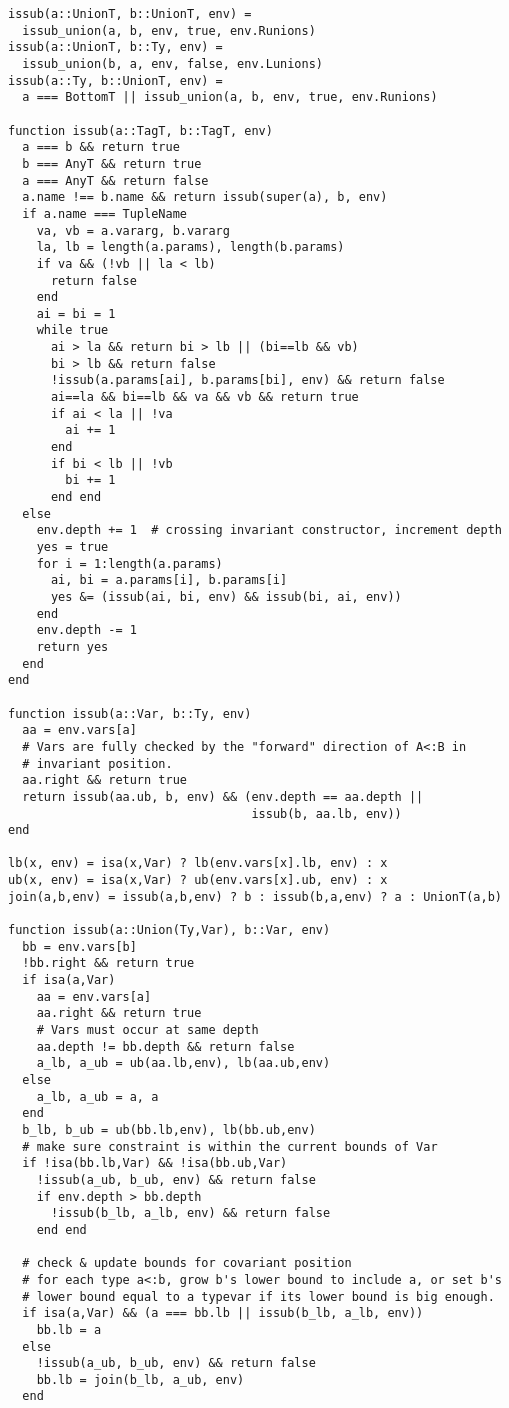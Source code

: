 \begin{singlespace}
\begin{lstlisting}[style=customjulia]
issub(a::UnionT, b::UnionT, env) =
  issub_union(a, b, env, true, env.Runions)
issub(a::UnionT, b::Ty, env) =
  issub_union(b, a, env, false, env.Lunions)
issub(a::Ty, b::UnionT, env) =
  a === BottomT || issub_union(a, b, env, true, env.Runions)

function issub(a::TagT, b::TagT, env)
  a === b && return true
  b === AnyT && return true
  a === AnyT && return false
  a.name !== b.name && return issub(super(a), b, env)
  if a.name === TupleName
    va, vb = a.vararg, b.vararg
    la, lb = length(a.params), length(b.params)
    if va && (!vb || la < lb)
      return false
    end
    ai = bi = 1
    while true
      ai > la && return bi > lb || (bi==lb && vb)
      bi > lb && return false
      !issub(a.params[ai], b.params[bi], env) && return false
      ai==la && bi==lb && va && vb && return true
      if ai < la || !va
        ai += 1
      end
      if bi < lb || !vb
        bi += 1
      end end
  else
    env.depth += 1  # crossing invariant constructor, increment depth
    yes = true
    for i = 1:length(a.params)
      ai, bi = a.params[i], b.params[i]
      yes &= (issub(ai, bi, env) && issub(bi, ai, env))
    end
    env.depth -= 1
    return yes
  end
end

function issub(a::Var, b::Ty, env)
  aa = env.vars[a]
  # Vars are fully checked by the "forward" direction of A<:B in
  # invariant position.
  aa.right && return true
  return issub(aa.ub, b, env) && (env.depth == aa.depth ||
                                  issub(b, aa.lb, env))
end

lb(x, env) = isa(x,Var) ? lb(env.vars[x].lb, env) : x
ub(x, env) = isa(x,Var) ? ub(env.vars[x].ub, env) : x
join(a,b,env) = issub(a,b,env) ? b : issub(b,a,env) ? a : UnionT(a,b)

function issub(a::Union(Ty,Var), b::Var, env)
  bb = env.vars[b]
  !bb.right && return true
  if isa(a,Var)
    aa = env.vars[a]
    aa.right && return true
    # Vars must occur at same depth
    aa.depth != bb.depth && return false
    a_lb, a_ub = ub(aa.lb,env), lb(aa.ub,env)
  else
    a_lb, a_ub = a, a
  end
  b_lb, b_ub = ub(bb.lb,env), lb(bb.ub,env)
  # make sure constraint is within the current bounds of Var
  if !isa(bb.lb,Var) && !isa(bb.ub,Var)
    !issub(a_ub, b_ub, env) && return false
    if env.depth > bb.depth
      !issub(b_lb, a_lb, env) && return false
    end end

  # check & update bounds for covariant position
  # for each type a<:b, grow b's lower bound to include a, or set b's
  # lower bound equal to a typevar if its lower bound is big enough.
  if isa(a,Var) && (a === bb.lb || issub(b_lb, a_lb, env))
    bb.lb = a
  else
    !issub(a_ub, b_ub, env) && return false
    bb.lb = join(b_lb, a_ub, env)
  end


\end{lstlisting}
\end{singlespace}
